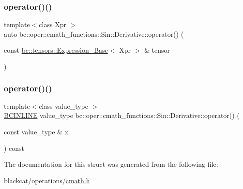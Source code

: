 \mbox{\label{structbc_1_1oper_1_1cmath__functions_1_1Sin_1_1Derivative_ab6f246984f62b00caa5d481aafd155af}} 
\subsubsection{\texorpdfstring{operator()()}{operator()()}\hspace{0.1cm}{\footnotesize\ttfamily [2/3]}}
{\footnotesize\ttfamily template$<$class Xpr $>$ \\
auto bc\+::oper\+::cmath\+\_\+functions\+::\+Sin\+::\+Derivative\+::operator() (\begin{DoxyParamCaption}\item[{const \hyperlink{classbc_1_1tensors_1_1Expression__Base}{bc\+::tensors\+::\+Expression\+\_\+\+Base}$<$ Xpr $>$ \&}]{tensor }\end{DoxyParamCaption})\hspace{0.3cm}{\ttfamily [inline]}}

\mbox{\label{structbc_1_1oper_1_1cmath__functions_1_1Sin_1_1Derivative_aad90d5dfce5dd00fc12d850005537091}} 
\subsubsection{\texorpdfstring{operator()()}{operator()()}\hspace{0.1cm}{\footnotesize\ttfamily [3/3]}}
{\footnotesize\ttfamily template$<$class value\+\_\+type $>$ \\
\hyperlink{common_8h_a6699e8b0449da5c0fafb878e59c1d4b1}{B\+C\+I\+N\+L\+I\+NE} value\+\_\+type bc\+::oper\+::cmath\+\_\+functions\+::\+Sin\+::\+Derivative\+::operator() (\begin{DoxyParamCaption}\item[{const value\+\_\+type \&}]{x }\end{DoxyParamCaption}) const\hspace{0.3cm}{\ttfamily [inline]}}



The documentation for this struct was generated from the following file\+:\begin{DoxyCompactItemize}
\item 
blackcat/operations/\hyperlink{cmath_8h}{cmath.\+h}\end{DoxyCompactItemize}
